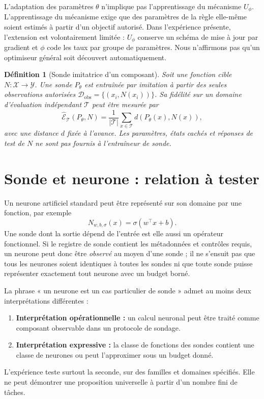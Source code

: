 \documentclass[11pt,a4paper]{article}
\newtheorem{definition}{Définition}
\begin{document}
L'adaptation des paramètres $\theta$ n'implique pas l'apprentissage du mécanisme $U_\phi$. L'apprentissage du mécanisme exige que des paramètres de la règle elle-même soient estimés à partir d'un objectif autorisé. Dans l'expérience présente, l'extension est volontairement limitée : $U_\phi$ conserve un schéma de mise à jour par gradient et $\phi$ code les taux par groupe de paramètres. Nous n'affirmons pas qu'un optimiseur général soit découvert automatiquement.

\begin{definition}[Sonde imitatrice d'un composant]
Soit une fonction cible $N:\mathcal X\to\mathcal Y$. Une sonde $P_\theta$ est entraînée par imitation à partir des seules observations autorisées $\mathcal D_{\mathrm{obs}}=\{(x_i,N(x_i))\}$. Sa fidélité sur un domaine d'évaluation indépendant $\mathcal T$ peut être mesurée par
\[
 \widehat{\mathcal E}_{\mathcal T}(P_\theta,N)
 =\frac{1}{|\mathcal T|}\sum_{x\in\mathcal T}d(P_\theta(x),N(x)),
\]
avec une distance $d$ fixée à l'avance. Les paramètres, états cachés et réponses de test de $N$ ne sont pas fournis à l'entraîneur de sonde.
\end{definition}

\section{Sonde et neurone : relation à tester}
Un neurone artificiel standard peut être représenté sur son domaine par une fonction, par exemple
\[
 N_{w,b,\sigma}(x)=\sigma(w^\top x+b).
\]
Une sonde dont la sortie dépend de l'entrée est elle aussi un opérateur fonctionnel. Si le registre de sonde contient les métadonnées et contrôles requis, un neurone peut donc être \emph{observé} au moyen d'une sonde ; il ne s'ensuit pas que tous les neurones soient identiques à toutes les sondes ni que toute sonde puisse représenter exactement tout neurone avec un budget borné.

La phrase « un neurone est un cas particulier de sonde » admet au moins deux interprétations différentes :
\begin{enumerate}
 \item \textbf{Interprétation opérationnelle :} un calcul neuronal peut être traité comme composant observable dans un protocole de sondage.
 \item \textbf{Interprétation expressive :} la classe de fonctions des sondes contient une classe de neurones ou peut l'approximer sous un budget donné.
\end{enumerate}
L'expérience teste surtout la seconde, sur des familles et domaines spécifiés. Elle ne peut démontrer une proposition universelle à partir d'un nombre fini de tâches.
\end{document}
